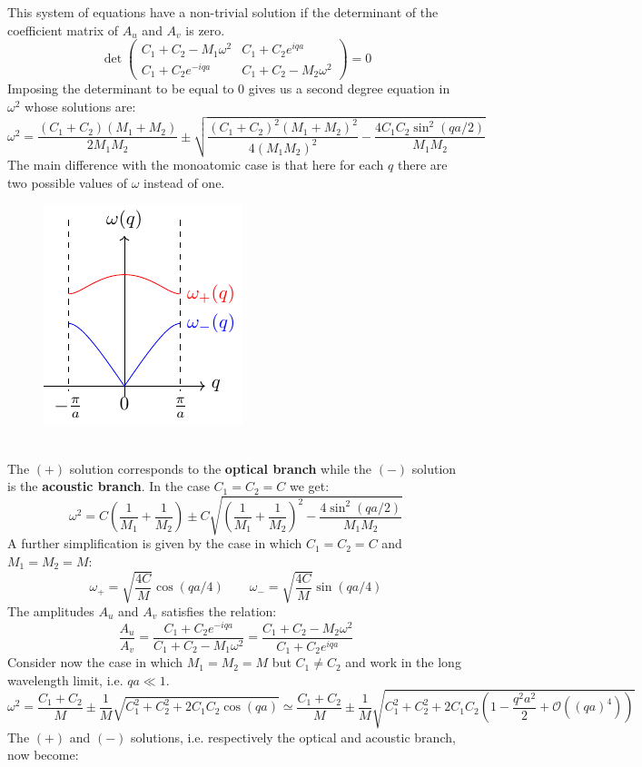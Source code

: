 \documentclass[10.75pt,a4paper,openright,bottom=2cm]{article}
\begin{document}
This system of equations have a non-trivial solution if the determinant of the coefficient matrix of $A_u$ and $A_v$ is zero.
\[
\det\left(\begin{array}{cc}
    C_1+C_2-M_1\omega^2 & C_1+C_2e^{iqa} \\
    C_1+C_2e^{-iqa} & C_1+C_2-M_2\omega^2
\end{array}\right)=0
\]
Imposing the determinant to be equal to 0 gives us a second degree equation in $\omega^2$ whose solutions are:
\[
\omega^2=\frac{(C_1+C_2)(M_1+M_2)}{2M_1M_2}\pm\sqrt{\frac{(C_1+C_2)^2(M_1+M_2)^2}{4(M_1M_2)^2}-\frac{4C_1C_2\sin^2(qa/2)}{M_1M_2}}
\]
The main difference with the monoatomic case is that here for each $q$ there are two possible values of $\omega$ instead of one.
\begin{figure}[h]
    \centering
    \includegraphics{omega+-.pdf}
    \label{fig:omega+-}
\end{figure}\\
\noindent
The $(+)$ solution corresponds to the \textbf{optical branch} while the $(-)$ solution is the \textbf{acoustic branch}. In the case $C_1=C_2=C$ we get:
\[
\omega^2=C\left(\frac{1}{M_1}+\frac{1}{M_2}\right)\pm C\sqrt{\left(\frac{1}{M_1}+\frac{1}{M_2}\right)^2-\frac{4\sin^2(qa/2)}{M_1M_2}}
\]
A further simplification is given by the case in which $C_1=C_2=C$ and $M_1=M_2=M$:
\[
\omega_+=\sqrt{\frac{4C}{M}}\cos(qa/4) \qquad \omega_-=\sqrt{\frac{4C}{M}}\sin(qa/4)
\]
The amplitudes $A_u$ and $A_v$ satisfies the relation:
\[
\frac{A_u}{A_v}=\frac{C_1+C_2e^{-iqa}}{C_1+C_2-M_1\omega^2}=\frac{C_1+C_2-M_2\omega^2}{C_1+C_2e^{iqa}}
\]
Consider now the case in which $M_1=M_2=M$ but $C_1\neq C_2$ and work in the long wavelength limit, i.e. $qa\ll1$.
\[
\omega^2=\frac{C_1+C_2}{M}\pm\frac{1}{M}\sqrt{C_1^2+C_2^2+2C_1C_2\cos(qa)}\simeq\frac{C_1+C_2}{M}\pm\frac{1}{M}\sqrt{C_1^2+C_2^2+2C_1C_2\left(1-\frac{q^2a^2}{2}+\mathcal{O}((qa)^4)\right)}
\]
The $(+)$ and $(-)$ solutions, i.e. respectively the optical and acoustic branch, now become:
\end{document}
